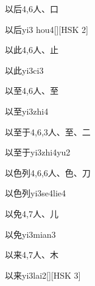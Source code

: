 \begin{entry}{以后}{4,6}{⼈、⼝}
  \begin{phonetics}{以后}{yi3 hou4}[][HSK 2]
  \end{phonetics}
\end{entry}

\begin{entry}{以此}{4,6}{⼈、⽌}
  \begin{phonetics}{以此}{yi3ci3}
  \end{phonetics}
\end{entry}

\begin{entry}{以至}{4,6}{⼈、⾄}
  \begin{phonetics}{以至}{yi3zhi4}
  \end{phonetics}
\end{entry}

\begin{entry}{以至于}{4,6,3}{⼈、⾄、⼆}
  \begin{phonetics}{以至于}{yi3zhi4yu2}
  \end{phonetics}
\end{entry}

\begin{entry}{以色列}{4,6,6}{⼈、⾊、⼑}
  \begin{phonetics}{以色列}{yi3se4lie4}
  \end{phonetics}
\end{entry}

\begin{entry}{以免}{4,7}{⼈、⼉}
  \begin{phonetics}{以免}{yi3mian3}
  \end{phonetics}
\end{entry}

\begin{entry}{以来}{4,7}{⼈、⽊}
  \begin{phonetics}{以来}{yi3lai2}[][HSK 3]
  \end{phonetics}
\end{entry}

